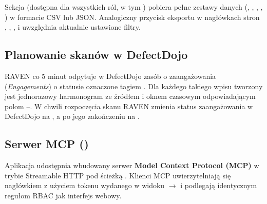 \documentclass[10pt,a4paper]{article}
\begin{document}
Sekcja  (dostępna dla wszystkich ról, w tym ) pobiera pełne zestawy danych (, , , , ) w formacie CSV lub JSON. Analogiczny przycisk eksportu w nagłówkach stron , , ,  i  uwzględnia aktualnie ustawione filtry.


\subsection{Planowanie skanów w DefectDojo}

RAVEN co 5 minut odpytuje w DefectDojo zasób  o zaangażowania (\emph{Engagements}) o statusie  oznaczone tagiem . Dla każdego takiego wpisu tworzony jest jednorazowy harmonogram ze źródłem  i oknem czasowym odpowiadającym polom --. W chwili rozpoczęcia skanu RAVEN zmienia status zaangażowania w DefectDojo na , a po jego zakończeniu na .

\subsection{Serwer MCP ()}

Aplikacja udostępnia wbudowany serwer \textbf{Model Context Protocol (MCP)} w trybie Streamable HTTP pod ścieżką . Klienci MCP uwierzytelniają się nagłówkiem  z użyciem tokenu wydanego w widoku  $\rightarrow$  i podlegają identycznym regułom RBAC jak interfejs webowy.
\end{document}
